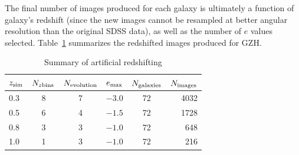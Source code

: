 \documentclass[twocolumn]{aastex6}
\begin{document}
The final number of \ferengi{} images produced for each galaxy is ultimately a function of galaxy's redshift (since the new images cannot be resampled at better angular resolution than the original SDSS data), as well as the number of $e$ values selected. Table~\ref{tbl:ferengivalues} summarizes the redshifted images produced for GZH. 

\begin{table}
\caption{Summary of \ferengi{} artificial redshifting \label{tbl:ferengivalues}}
\begin{tabular}{lccccr}
\hline\hline
$z_{\rm sim}$ & $N_{z {\rm bins}}$ & $N_{\rm evolution}$ & $e_{\rm max}$ & $N_{\rm galaxies}$ & $N_{\rm images}$\\
\hline
0.3              & 8                  & 7                   & $-3.0$        & 72             & 4032 \\
0.5              & 6                  & 4                   & $-1.5$        & 72             & 1728 \\
0.8              & 3                  & 3                   & $-1.0$        & 72             &  648 \\
1.0              & 1                  & 3                   & $-1.0$        & 72             &  216 \\
\hline\hline
\end{tabular}
\end{table}
\end{document}
